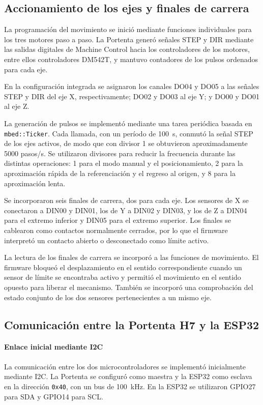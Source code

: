 \subsection{Accionamiento de los ejes y finales de carrera}

La programación del movimiento se inició mediante funciones individuales para los tres motores paso a paso. La Portenta generó señales STEP y DIR mediante las salidas digitales de Machine Control hacia los controladores de los motores, entre ellos controladores DM542T, y mantuvo contadores de los pulsos ordenados para cada eje.

En la configuración integrada se asignaron los canales DO04 y DO05 a las señales STEP y DIR del eje X, respectivamente; DO02 y DO03 al eje Y; y DO00 y DO01 al eje Z.

La generación de pulsos se implementó mediante una tarea periódica basada en \texttt{mbed::Ticker}. Cada llamada, con un período de 100~\textmu s, conmutó la señal STEP de los ejes activos, de modo que con divisor 1 se obtuvieron aproximadamente 5000 pasos/s. Se utilizaron divisores para reducir la frecuencia durante las distintas operaciones: 1 para el modo manual y el posicionamiento, 2 para la aproximación rápida de la referenciación y el regreso al origen, y 8 para la aproximación lenta.

Se incorporaron seis finales de carrera, dos para cada eje. Los sensores de X se conectaron a DIN00 y DIN01, los de Y a DIN02 y DIN03, y los de Z a DIN04 para el extremo inferior y DIN05 para el extremo superior. Los finales se cablearon como contactos normalmente cerrados, por lo que el firmware interpretó un contacto abierto o desconectado como límite activo.

La lectura de los finales de carrera se incorporó a las funciones de movimiento. El firmware bloqueó el desplazamiento en el sentido correspondiente cuando un sensor de límite se encontraba activo y permitió el movimiento en el sentido opuesto para liberar el mecanismo. También se incorporó una comprobación del estado conjunto de los dos sensores pertenecientes a un mismo eje.


\subsection{Comunicación entre la Portenta H7 y la ESP32}

\paragraph{Enlace inicial mediante I2C} La comunicación entre los dos microcontroladores se implementó inicialmente mediante I2C. La Portenta se configuró como maestra y la ESP32 como esclava en la dirección \texttt{0x40}, con un bus de 100~kHz. En la ESP32 se utilizaron GPIO27 para SDA y GPIO14 para SCL.


